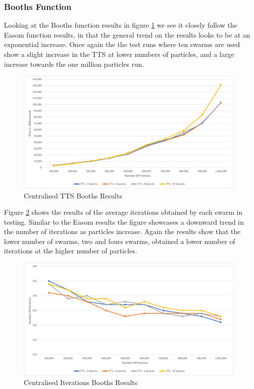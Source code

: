 \documentclass[oneside,12pt]{book}
\begin{document}
\subsubsection{Booths Function}
Looking at the Booths function results in figure \ref{fig:Centralised_TTS_Booths_Results} we see it closely follow the Easom function results, in that the general trend on the results looks to be at an exponential increase. Once again the the test runs where ten swarms are used show a slight increase in the TTS at lower numbers of particles, and a large increase towards the one million particles run.

\begin{figure}[H]
    \centering
    \includegraphics[scale=0.45]{Images/Graphs/CentralisedBoothsTTS.png}
    \caption{Centralised TTS Booths Results}
    \label{fig:Centralised_TTS_Booths_Results}
\end{figure}

Figure \ref{fig:Centralised_Epoc_Booths_Results} shows the results of the average iterations obtained by each swarm in testing. Similar to the Easom results the figure showcases a downward trend in the number of iterations as particles increase. Again the results show that the lower number of swarms, two and fours swarms, obtained a lower number of iterations at the higher number of particles. 

\begin{figure}[H]
    \centering
    \includegraphics[scale=0.45]{Images/Graphs/CentralisedBoothsEpoch.png}
    \caption{Centralised Iterations Booths Results}
    \label{fig:Centralised_Epoc_Booths_Results}
\end{figure}
\end{document}

